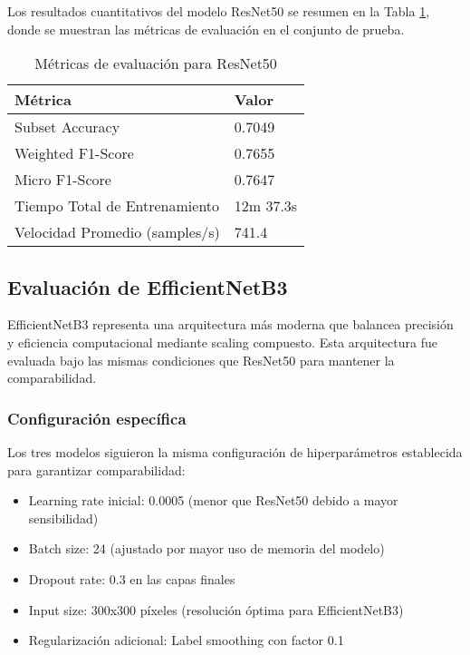 Los resultados cuantitativos del modelo ResNet50 se resumen en la Tabla \ref{tab:resnet_metrics}, donde se muestran las métricas de evaluación en el conjunto de prueba.

\begin{table}[H]
\centering
\renewcommand{\arraystretch}{1.3}
\caption{Métricas de evaluación para ResNet50}
\label{tab:resnet_metrics}
\begin{tabular}{|p{4cm}|p{3cm}|}
\hline
\textbf{Métrica} & \textbf{Valor} \\ \hline
Subset Accuracy & 0.7049 \\ \hline
Weighted F1-Score & 0.7655 \\ \hline
Micro F1-Score & 0.7647 \\ \hline
Tiempo Total de Entrenamiento & 12m 37.3s \\ \hline
Velocidad Promedio (samples/s) & 741.4 \\ \hline
\end{tabular}
\end{table}

\subsection{Evaluación de EfficientNetB3}

EfficientNetB3 representa una arquitectura más moderna que balancea precisión y eficiencia computacional mediante scaling compuesto. Esta arquitectura fue evaluada bajo las mismas condiciones que ResNet50 para mantener la comparabilidad.

\subsubsection{Configuración específica}

Los tres modelos siguieron la misma configuración de hiperparámetros establecida para garantizar comparabilidad:

\begin{itemize}
\item Learning rate inicial: 0.0005 (menor que ResNet50 debido a mayor sensibilidad)
\item Batch size: 24 (ajustado por mayor uso de memoria del modelo)
\item Dropout rate: 0.3 en las capas finales
\item Input size: 300x300 píxeles (resolución óptima para EfficientNetB3)
\item Regularización adicional: Label smoothing con factor 0.1
\end{itemize}

